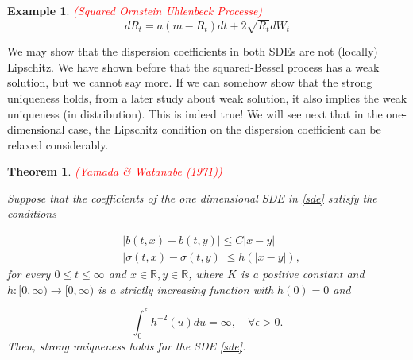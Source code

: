 \documentclass{article}
\newtheorem{theorem}{Theorem}
\newtheorem{ex}{Example}
\begin{document}
\begin{ex} \textcolor{red}{(Squared Ornstein Uhlenbeck Processe)}
\begin{equation*}
dR_t=a(m-R_t)dt+2\sqrt{R_t}dW_t
\end{equation*}
\end{ex}

We may show that the dispersion coefficients in both SDEs are not (locally) Lipschitz. We have shown before that the squared-Bessel process has a weak solution, but we cannot say more. If we can somehow show that the strong uniqueness holds, from a later study about weak solution, it also implies the weak uniqueness (in distribution). This is indeed true! We will see next that in the one-dimensional case, the Lipschitz condition on the dispersion coefficient can be relaxed considerably. 

\begin{theorem} \textcolor{red}{(Yamada \& Watanabe (1971))}

Suppose that the coefficients of the one dimensional SDE in \eqref{sde} satisfy the conditions

\begin{equation}
\begin{aligned}
&|b(t,x)-b(t,y)|\leq C|x-y|\\
&|\sigma(t,x)-\sigma(t,y)|\leq h(|x-y|),
\end{aligned}
\end{equation}
for every $0\leq t\leq \infty$ and $x\in\mathbb{R},y\in\mathbb{R}$, where $K$ is a positive constant and $h:[0,\infty)\rightarrow[0,\infty)$ is a strictly increasing function with $h(0)=0$ and 

\begin{equation} \label{yamada_watanabe_h}
\int_0^\epsilon h^{-2}(u)du=\infty, \quad \forall\epsilon>0.
\end{equation}
Then, strong uniqueness holds for the SDE \eqref{sde}.
\end{theorem}
\end{document}

